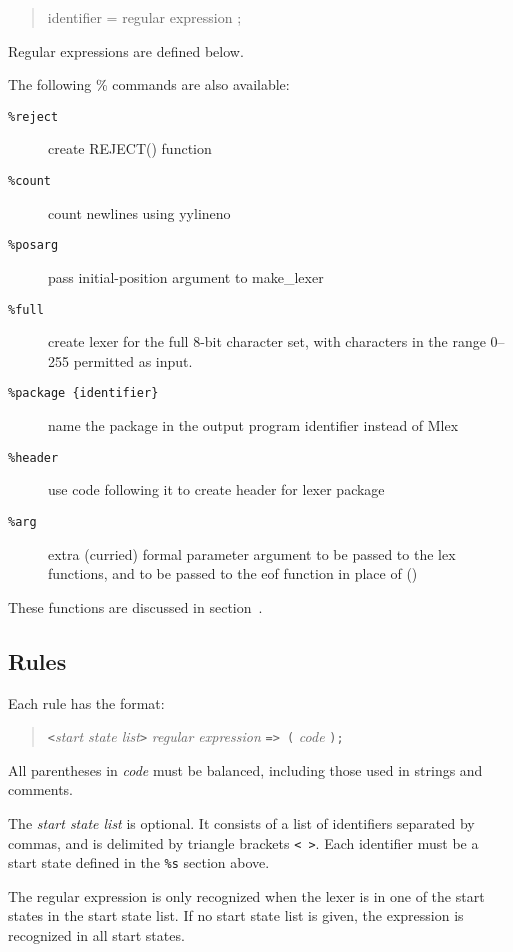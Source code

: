 \begin{quote}
        {identifier} = {regular expression} ;
\end{quote}

Regular expressions are defined below.

The following \% commands are also available:

\begin{description}
\item[\tt \%reject]     create REJECT() function
\item[\tt \%count]      count newlines using yylineno
\item[\tt \%posarg]     pass initial-position argument to make_lexer
\item[\tt \%full]       create lexer for the full 8-bit character set,
                          with characters in the range 0--255 permitted
                          as input.
\item[\tt \%package \{identifier\}]  name the package in the output program
                          {identifier} instead of Mlex
\item[\tt \%header] 	use code following it to create header for lexer
			  package
\item[\tt \%arg]       extra (curried) formal parameter argument to be
			  passed to the lex functions, and to be passed
			  to the eof function in place of ()
\end{description}
        These functions are discussed in section~.

\subsection{Rules}

Each rule has the format:

\begin{quote}
       \verb|<|{\it start state list}\verb|>| {\it regular expression} \verb|=> (| {\it code} \verb|);|
\end{quote}

All parentheses in  {\it code}  must be balanced, including those
used in strings and comments.

The {\it start state list} is optional.  It consists of a list of
identifiers separated by commas, and is delimited by triangle
brackets \verb|< >|.  Each identifier must be a start state defined in the
\verb|%s| section above.

The regular expression is only recognized when the lexer is in one of
the start states in the start state list.  If no start state list is
given, the expression is recognized in all start states.

